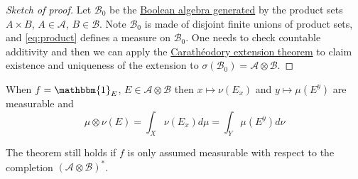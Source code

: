 \documentclass{article}
\newcommand{\1}[1]{\mathbbm{1}_{#1}}
\begin{document}
\begin{proof}[Sketch of proof]
    Let $\mathcal{B}_0$ be the \hyperlink{def:genAlg}{Boolean algebra generated} by the product sets $A \times B$, $A \in \mathcal{A}$, $B \in \mathcal{B}$.
    Note $\mathcal{B}_0$ is made of disjoint finite unions of product sets, and \eqref{eq:product} defines a measure on $\mathcal{B}_0$.
    One needs to check countable additivity and then we can apply the \hyperlink{thm:caratheodory}{Carath\'eodory extension theorem} to claim existence and uniqueness of the extension to $\sigma(\mathcal{B}_0) = \mathcal{A} \otimes \mathcal{B}$.
\end{proof}


\begin{remark}
    When $f = \1{E}$, $E \in \mathcal{A} \otimes \mathcal{B}$ then $x \mapsto \nu(E_x)$ and $y \mapsto \mu(E^y)$ are measurable and
    \begin{equation*}
        \mu \otimes \nu(E) = \int_X \nu(E_x) d \mu = \int_Y \mu(E^y) d \nu
    \end{equation*}

    The theorem still holds if $f$ is only assumed measurable with respect to the completion $(\mathcal{A} \otimes \mathcal{B})^*$.
\end{remark}
\end{document}
